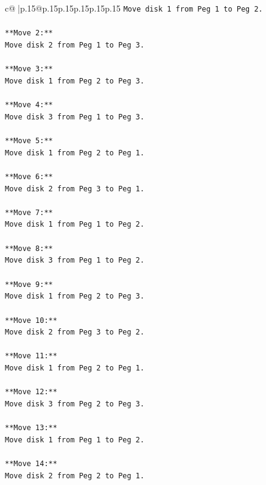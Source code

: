 \documentclass{article}
\begin{document}
{\begin{supertabular}{c@{$\;$}|p{.15\linewidth}@{}p{.15\linewidth}p{.15\linewidth}p{.15\linewidth}p{.15\linewidth}p{.15\linewidth}}
{{{\texttt{Move disk 1 from Peg 1 to Peg 2.} \\
\\ 
\texttt{**Move 2:**} \\
\texttt{Move disk 2 from Peg 1 to Peg 3.} \\
\\ 
\texttt{**Move 3:**} \\
\texttt{Move disk 1 from Peg 2 to Peg 3.} \\
\\ 
\texttt{**Move 4:**} \\
\texttt{Move disk 3 from Peg 1 to Peg 3.} \\
\\ 
\texttt{**Move 5:**} \\
\texttt{Move disk 1 from Peg 2 to Peg 1.} \\
\\ 
\texttt{**Move 6:**} \\
\texttt{Move disk 2 from Peg 3 to Peg 1.} \\
\\ 
\texttt{**Move 7:**} \\
\texttt{Move disk 1 from Peg 1 to Peg 2.} \\
\\ 
\texttt{**Move 8:**} \\
\texttt{Move disk 3 from Peg 1 to Peg 2.} \\
\\ 
\texttt{**Move 9:**} \\
\texttt{Move disk 1 from Peg 2 to Peg 3.} \\
\\ 
\texttt{**Move 10:**} \\
\texttt{Move disk 2 from Peg 3 to Peg 2.} \\
\\ 
\texttt{**Move 11:**} \\
\texttt{Move disk 1 from Peg 2 to Peg 1.} \\
\\ 
\texttt{**Move 12:**} \\
\texttt{Move disk 3 from Peg 2 to Peg 3.} \\
\\ 
\texttt{**Move 13:**} \\
\texttt{Move disk 1 from Peg 1 to Peg 2.} \\
\\ 
\texttt{**Move 14:**} \\
\texttt{Move disk 2 from Peg 2 to Peg 1.} \\
\\ 
}}}
\end{supertabular}}
\end{document}
